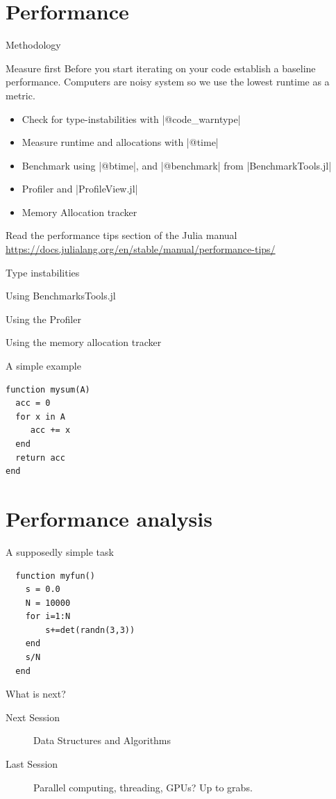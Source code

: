 \documentclass{beamer}
\begin{document}
\section{Performance}
\begin{frame}[fragile]{Methodology}
  \pause
  \begin{block}{Measure first}
    Before you start iterating on your code establish a baseline performance.
    Computers are noisy system so we use the lowest runtime as a metric.
  \end{block}
  \pause
  \begin{itemize}
    \item Check for type-instabilities with |@code\_warntype|
    \item Measure runtime and allocations with |@time|
    \item Benchmark using |@btime|, and |@benchmark| from |BenchmarkTools.jl|
    \item Profiler and |ProfileView.jl|
    \item Memory Allocation tracker
  \end{itemize}
  \pause
  Read the performance tips section of the Julia manual \url{https://docs.julialang.org/en/stable/manual/performance-tips/}
\end{frame}
\begin{frame}[fragile]{Type instabilities}
\end{frame}
\begin{frame}[fragile]{Using BenchmarksTools.jl}
\end{frame}
\begin{frame}[fragile]{Using the Profiler}
\end{frame}
\begin{frame}[fragile]{Using the memory allocation tracker}
\end{frame}
\begin{frame}[fragile]{A simple example}
\begin{lstlisting}
function mysum(A)
  acc = 0
  for x in A
     acc += x
  end
  return acc
end
\end{lstlisting}
\end{frame}
\section{Performance analysis}
\begin{frame}[fragile]{A supposedly simple task}
  \begin{lstlisting}
  function myfun()
    s = 0.0
    N = 10000
    for i=1:N
        s+=det(randn(3,3))
    end
    s/N
  end
  \end{lstlisting}
\end{frame}

\begin{frame}{What is next?}
  \begin{description}
    \item[Next Session] Data Structures and Algorithms
    \item[Last Session] Parallel computing, threading, GPUs? Up to grabs.
  \end{description}
\end{frame}
\end{document}
